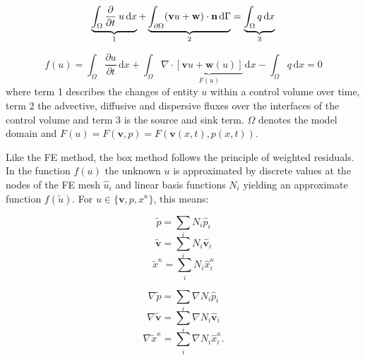 \begin{equation}
  \underbrace{\int_\Omega \frac{\partial}{\partial t} \: u \, \mathrm{d}x}_{1}
  + \underbrace{\int_{\partial\Omega} (\mathbf{v} u + \mathbf w) \cdot \textbf n \, \mathrm{d}\Gamma}_{2} = \underbrace{\int_\Omega q \, \mathrm{d}x}_{3}
\end{equation}

\begin{equation}
  f(u) = \int_\Omega \frac{\partial u}{\partial t} \, \mathrm{d}x + \int_{\Omega} \nabla \cdot
  \underbrace{\left[  \mathbf{v} u + \mathbf w(u)\right] }_{F(u)}  \, \mathrm{d}x - \int_\Omega q \, \mathrm{d}x = 0
\end{equation}
where term 1 describes the changes of entity $u$ within a control volume over
time, term 2 the advective, diffusive and dispersive fluxes over the interfaces
of the control volume and term 3 is the source and sink term. $\Omega$ denotes the
model domain and $F(u) = F(\mathbf v, p) = F(\mathbf v(x,t), p(x,t))$.

Like the FE method, the box method follows the principle of weighted residuals.
In the function $f(u)$ the unknown $u$ is approximated by discrete values at the
nodes of the FE mesh $\hat u_i$ and linear basis functions $N_i$ yielding an
approximate function $f(\tilde u)$. For $u\in \lbrace \mathbf v, p, x^\kappa \rbrace$, this means:

\begin{minipage}[b]{0.47\textwidth}
\begin{equation}
\label{eq:p}
  \tilde p = \sum_i N_i \hat{p}_i
\end{equation}
\begin{equation}
\label{eq:v}
  \tilde{\mathbf v} = \sum_i N_i \hat{\mathbf v}_i
\end{equation}
\begin{equation}
\label{eq:x}
  \tilde x^\kappa  = \sum_i N_i \hat x_i^\kappa
\end{equation}
\end{minipage}
\hfill
\begin{minipage}[b]{0.47\textwidth}
\begin{equation}
\label{eq:dp}
  \nabla \tilde p = \sum_i \nabla N_i \hat{p}_i
\end{equation}
\begin{equation}
\label{eq:dv}
  \nabla \tilde{\mathbf v} = \sum_i \nabla N_i \hat{\mathbf v}_i
\end{equation}
\begin{equation}
\label{eq:dx}
  \nabla \tilde x^\kappa  = \sum_i \nabla N_i \hat x_i^\kappa .
\end{equation}
\end{minipage}


